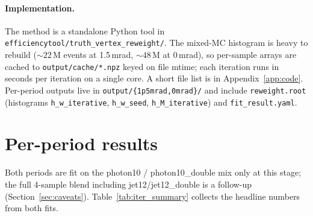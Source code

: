 \documentclass[11pt,a4paper]{article}
\begin{document}
\paragraph{Implementation.}
The method is a standalone Python tool in
\texttt{efficiencytool/truth\_vertex\_reweight/}. The mixed-MC histogram
is heavy to rebuild ($\sim\!22$\,M events at 1.5\,mrad,
$\sim\!48$\,M at 0\,mrad), so per-sample arrays are cached to
\texttt{output/cache/*.npz} keyed on file mtime; each iteration runs in
seconds per iteration on a single core. A short file list is in
Appendix~\ref{app:code}. Per-period outputs live in
\texttt{output/\{1p5mrad,0mrad\}/} and include
\texttt{reweight.root} (histograms \texttt{h\_w\_iterative},
\texttt{h\_w\_seed}, \texttt{h\_M\_iterative}) and
\texttt{fit\_result.yaml}.

\section{Per-period results}
\label{sec:results}

Both periods are fit on the photon10 / photon10\_double mix only at
this stage; the full 4-sample blend including jet12/jet12\_double is a
follow-up (Section~\ref{sec:caveats}). Table~\ref{tab:iter_summary}
collects the headline numbers from both fits.
\end{document}
